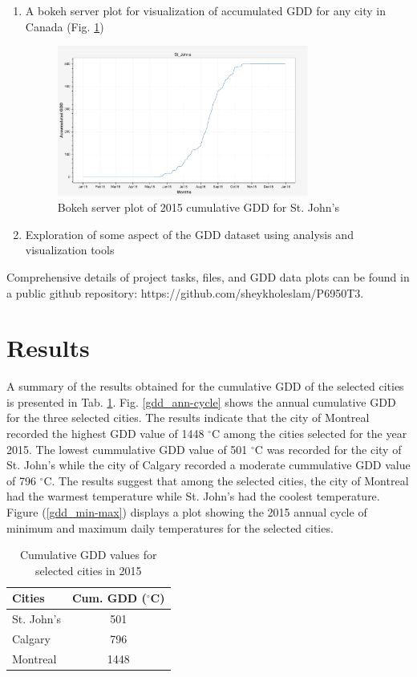 \documentclass{article}
\begin{document}
\begin{enumerate}
\item A bokeh server plot for visualization of accumulated GDD for any city in Canada (Fig. \ref{bokeh-server-plot_sj})

\begin{center}
\begin{figure}[!h]
\includegraphics[width=3.25in]{./source/Report/op-task_5.png}
\caption{Bokeh server plot of 2015 cumulative GDD for St. John's}
\label{bokeh-server-plot_sj}
\end{figure}
\end{center}

\item Exploration of some aspect of the GDD dataset using analysis and visualization tools
\end{enumerate}

Comprehensive details of project tasks, files, and GDD data plots can be found in a public github repository: https://github.com/sheykholeslam/P6950T3. 


\section{ \bf Results}
A summary of the results obtained for the cumulative GDD of the selected cities is presented in Tab. \ref{tbl:gdd-results}. Fig. \ref{gdd_ann-cycle} shows the annual cumulative GDD for the three selected cities. The results indicate that the city of Montreal recorded the highest GDD value of 1448 $^{\circ}$C among the cities selected for the year 2015. The lowest cummulative GDD value of 501 $^{\circ}$C was recorded for the city of St. John's while the city of Calgary recorded a moderate cummulative GDD value of 796 $^{\circ}$C. The results suggest that among the selected cities, the city of Montreal had the warmest temperature while St. John's had the coolest temperature. Figure (\ref{gdd_min-max}) displays a plot showing the 2015 annual cycle of minimum and maximum daily temperatures for the selected cities.

\begin{table}[h]
\caption{Cumulative GDD values for selected cities in 2015} 
\label{tbl:gdd-results}
\centering 
\begin{tabular}{l c}
\hline
\textbf{Cities} & \textbf{Cum. GDD} \textbf($^{\circ}$C) \\
\hline
St. John's & 501 \\
Calgary & 796 \\
Montreal & 1448 \\
\hline
\end{tabular}
\end{table}
\end{document}
